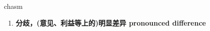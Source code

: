 
\begin{frame}
{\huge chasm}
\begin{center}
\begin{enumerate}\Large
  \item \textbf{分歧，(意见、利益等上的)明显差异 pronounced difference}
\end{enumerate}
\end{center}
\end{frame}
